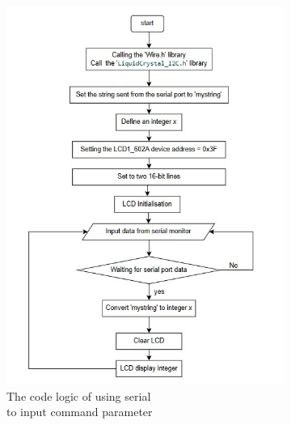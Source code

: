\begin{landscape}
    \begin{figure}[H] %
        \centering 
        \captionsetup{labelsep=colon}
        \begin{subfigure}{0.62\textwidth} %
            \centering
            \includegraphics[width=\linewidth]{Image/Design/code_logic_input.jpg}
            \caption{\centering The code logic of using serial \\to input command parameter}
            \label{fig:cl_input}
        \end{subfigure}
        \begin{subfigure}{0.62\textwidth} %
            \centering

\end{subfigure}
\end{figure}
\end{landscape}
